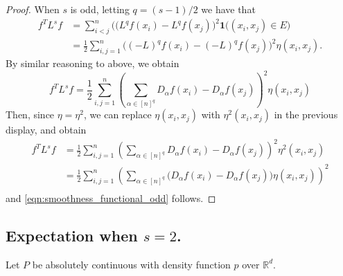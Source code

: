 \documentclass{article}
\newcommand{\Reals}{\mathbb{R}}
\newcommand{\1}{\mathbf{1}}
\newcommand{\Rd}{\Reals^d}
\theoremstyle{alden}
\theoremstyle{aldenthm}
\theoremstyle{definition}
\theoremstyle{remark}
\begin{document}
\begin{proof}
	When $s$ is odd, letting $q = (s-1)/2$ we have that
	\begin{align*}
	f^T L^s f & = \sum_{i < j}^{n} \bigl((L^q f (x_{i}) - L^q f (x_{j})\bigr)^2 \1\bigl( (x_{i},x_{j}) \in E\bigr) \\
	& = \frac{1}{2} \sum_{i, j = 1}^{n} \bigl( (-L)^q f (x_{i}) - (-L)^q f (x_{j})\bigr)^2 \eta(x_{i}, x_{j}).
	\end{align*}
	By similar reasoning to above, we obtain
	\begin{equation*}
	f^T L^s f = \frac{1}{2} \sum_{i,j = 1}^{n} \left(\sum_{\alpha \in [n]^q} D_{\alpha}f(x_i)  - D_{\alpha}f(x_j)\right)^2\eta(x_i,x_j)
	\end{equation*} 
	Then, since $\eta = \eta^2$, we can replace $\eta(x_i,x_j)$ with $\eta^2(x_i,x_j)$ in the previous display, and obtain
	\begin{align*}
	f^T L^s f & = \frac{1}{2} \sum_{i,j = 1}^{n} \left(\sum_{\alpha \in [n]^q} D_{\alpha}f(x_i)  - D_{\alpha}f(x_j)\right)^2\eta^2(x_i,x_j) \\
	& = \frac{1}{2} \sum_{i,j = 1}^{n} \left(\sum_{\alpha \in [n]^q} \bigl(D_{\alpha}f(x_i)  - D_{\alpha}f(x_j)\bigr)\eta(x_i,x_j)\right)^2 \\
	\end{align*}
	and \eqref{eqn:smoothness_functional_odd} follows.
\end{proof}

\subsection{Expectation when $s = 2$.}

Let $P$ be absolutely continuous with density function $p$ over $\Rd$.
\end{document}
